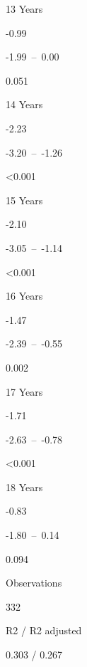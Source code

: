 \documentclass[
]{article}
\begin{document}
13 Years

-0.99

-1.99~--~0.00

0.051

14 Years

-2.23

-3.20~--~-1.26

\textless0.001

15 Years

-2.10

-3.05~--~-1.14

\textless0.001

16 Years

-1.47

-2.39~--~-0.55

0.002

17 Years

-1.71

-2.63~--~-0.78

\textless0.001

18 Years

-0.83

-1.80~--~0.14

0.094

Observations

332

R2 / R2 adjusted

0.303 / 0.267
\end{document}
